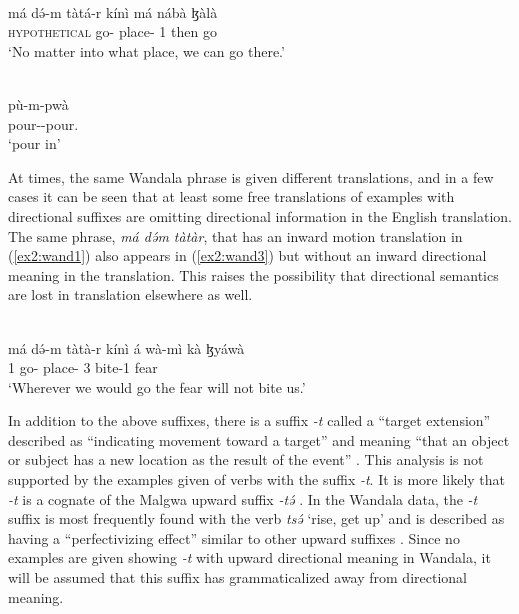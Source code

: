 \ea\label{ex2:wand1}
 \\
\gll má də́-m tàtá-r kínì má nábà ɮàlà \\
\textsc{hypothetical} go- place-  1 then go \\
\glt `No matter into what place, we can go there.'

\ex\label{ex2:wand2}
 \\
\gll pù-m-pwà \\
pour--pour.	\\
\glt `pour in'
\z 

At times, the same Wandala phrase is given different translations, and in a few cases it can be seen that at least some free translations of examples with directional suffixes are omitting directional information in the English translation. The same phrase, \textit{má də́m tàtàr}, that has an inward motion translation in (\ref{ex2:wand1}) also appears in (\ref{ex2:wand3}) but without an inward directional meaning in the translation. This raises the possibility that directional semantics are lost in translation elsewhere as well. 

\ea\label{ex2:wand3}
 \\
\gll má də́-m tàtà-r kínì á wà-mì kà ɮyáwà \\
1 go- place-  3 bite-1  fear \\
\glt `Wherever we would go the fear will not bite us.'
\z 

In addition to the above suffixes, there is a suffix \textit{-t} called a ``target extension'' described as ``indicating movement toward a target'' and meaning ``that an object or subject has a new location as the result of the event'' \citep[16, 286]{frajzyngierGrammarWandala2012}. This analysis is not supported by the examples given of verbs with the suffix \textit{-t}. It is more likely that \textit{-t} is a cognate of the Malgwa upward suffix \textit{-tə́} \citep[153]{lohrSpracheMalgwaNara2002}. In the Wandala data, the \textit{-t} suffix is most frequently found with the verb \textit{tsə́} `rise, get up' and is described as having a ``perfectivizing effect'' similar to other upward suffixes \citep[285]{frajzyngierGrammarWandala2012}. Since no examples are given showing \textit{-t} with upward directional meaning in Wandala, it will be assumed that this suffix has grammaticalized away from directional meaning. 

